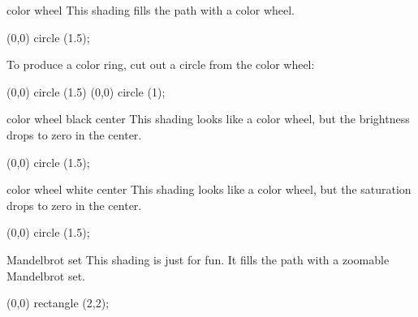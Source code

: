 \begin{shading}{color wheel}
  \label{shading-color-wheel}
  This shading fills the path with a color wheel.
\begin{codeexample}[]
\tikz \shade[shading=color wheel] (0,0) circle (1.5);
\end{codeexample}
  To produce a color ring, cut out a circle from the color wheel:
\begin{codeexample}[]
\tikz {}
  (0,0) circle (1.5)
  (0,0) circle (1);
\end{codeexample}
\end{shading}


\begin{shading}{color wheel black center}
  This shading looks like a color wheel, but the brightness drops to
  zero in the center.
\begin{codeexample}[]
\tikz \shade[shading=color wheel black center] (0,0) circle (1.5);
\end{codeexample}
\end{shading}


\begin{shading}{color wheel white center}
  This shading looks like a color wheel, but the saturation drops to
  zero in the center.
\begin{codeexample}[]
\tikz \shade[shading=color wheel white center] (0,0) circle (1.5);
\end{codeexample}
\end{shading}



\begin{shading}{Mandelbrot set}
  This shading is just for fun. It fills the path with a zoomable
  Mandelbrot set.

\begin{codeexample}[]
\tikz \shade[shading=Mandelbrot set] (0,0) rectangle (2,2);
\end{codeexample}
\end{shading}



